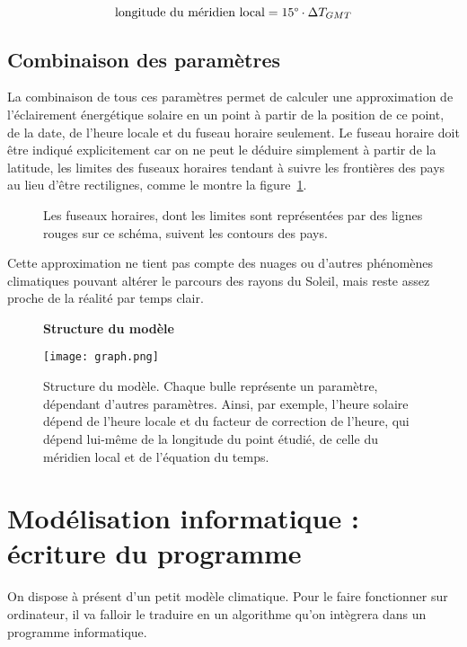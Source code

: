 \documentclass[12pt]{article}
\begin{document}
\[
	\text{longitude du méridien local} = 15 \degree \cdot \Delta T_{GMT}
\]


\subsection{Combinaison des paramètres}
La combinaison de tous ces paramètres permet de calculer une approximation de l'éclairement énergétique solaire en un point à partir de la position de ce point, de la date, de l'heure locale et du fuseau horaire seulement.
Le fuseau horaire doit être indiqué explicitement car on ne peut le déduire simplement à partir de la latitude, les limites des fuseaux horaires tendant à suivre les frontières des pays au lieu d'être rectilignes, comme le montre la figure~\ref{fig:timezones}.

\begin{figure}[!ht]
  \centering
  \caption{Les fuseaux horaires, dont les limites sont représentées par des lignes rouges sur ce schéma, suivent les contours des pays.}
  \label{fig:timezones}
\end{figure}

Cette approximation ne tient pas compte des nuages ou d'autres phénomènes climatiques pouvant altérer le parcours des rayons du Soleil, mais reste assez proche de la réalité par temps clair.

\clearpage
\begin{figure}[!htb]
	\centering
	{ \Large \textbf{Structure du modèle} \par\medskip }
	\centerline{\texttt{[image: graph.png]}}
	\caption{Structure du modèle. Chaque bulle représente un paramètre, dépendant d'autres paramètres. Ainsi, par exemple, l'heure solaire dépend de l'heure locale et du facteur de correction de l'heure, qui dépend lui-même de la longitude du point étudié, de celle du méridien local et de l'équation du temps.}
	\label{fig:model-structure}
\end{figure}

\clearpage
\section{Modélisation informatique : écriture du programme}

On dispose à présent d'un petit modèle climatique.
Pour le faire fonctionner sur ordinateur, il va falloir le traduire en un algorithme qu'on intègrera dans un programme informatique.
\end{document}
